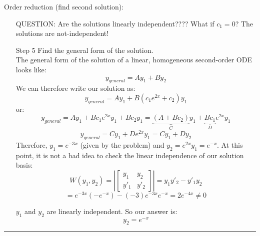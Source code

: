 \begin{exmp}{Order reduction (find second solution):}
\begin{itemize}
QUESTION: Are the solutions linearly independent????
What if $c_1=0$? The solutions are not-independent!
\item[Step 5] Find the general form of the solution.\\
The general form of the solution of a linear, homogeneous second-order ODE looks like:
\begin{equation*}
y_{general}=Ay_1+By_2
\end{equation*}
We can therefore write our solution as:
\begin{equation*}
y_{general}=Ay_1+B(c_1e^{2x}+c_2)y_1
\end{equation*}
or:
\begin{equation*}
y_{general}=Ay_1+Bc_1e^{2x}y_1+Bc_2y_1 = \underbrace{(A+Bc_2)}_C y_1+\underbrace{Bc_1}_De^{2x}y_1
\end{equation*}
\begin{equation*}
y_{general}=C y_1+De^{2x}y_1 = Cy_1+Dy_2
\end{equation*}
Therefore, $y_1=e^{-3x}$ (given by the problem) and $y_2=e^{2x}y_1=e^{-x}$.
 At this point, it is not a bad idea to check the linear independence of our solution basis:
 \begin{equation*}
W(y_1,y_2)=\left|\begin{bmatrix}
    y_1 & y_2  \\
    y'_1 & y'_2
  \end{bmatrix}\right| = y_1y'_2 -y'_1y_2 
\end{equation*}
 \begin{equation*}
 = e^{-3x}(-e^{-x})-(-3)e^{-3x}e^{-x}=2e^{-4x}\neq 0
 \end{equation*}
 
 $y_1$ and  $y_2$  are linearly independent. So our answer is:
 \begin{equation*}
\boxed{y_{2}=e^{-x}}
\end{equation*}
\end{itemize}

\end{exmp}


\begin{center}
\noindent\rule{4cm}{0.4pt}
\end{center}

